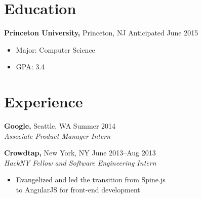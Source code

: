 \documentclass[margin]{res}
\begin{document}

\address{
  {\bf Present Address} \\
  3169 Frist Center \\
  Princeton, NJ 08544 
}

\address{
  dan@dskang.com \\ 
  http://dskang.com \\
  github.com/dskang
}

\begin{resume}

\section{Education}
 {\bf Princeton University,} Princeton, NJ \hfill Anticipated June
 2015
 \begin{itemize} \itemsep -2pt %
 \item Major: Computer Science
 \item GPA: 3.4
 \end{itemize}


\section{Experience}
 {\bf Google,} Seattle, WA \hfill Summer 2014 \\
 {\it Associate Product Manager Intern}

 {\bf Crowdtap,} New York, NY \hfill June 2013--Aug 2013 \\
 {\it HackNY Fellow and Software Engineering Intern}
 \begin{itemize} \itemsep -2pt  %
 \item Evangelized and led the transition from Spine.js \\
   to AngularJS for front-end development
 \end{itemize}



\end{resume}
\end{document}
